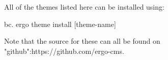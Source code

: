 All of the themes listed here can be installed using:

bc. ergo theme install [theme-name]

Note that the source for these can all be found on "github":https://github.com/ergo-cms.

